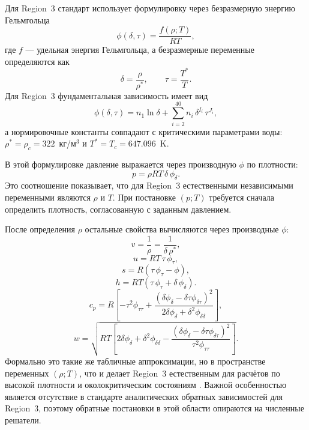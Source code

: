 Для Region~3 стандарт использует формулировку через безразмерную энергию Гельмгольца
\begin{equation}
\phi(\delta, \tau) = \frac{f(\rho; T)}{R T},
\end{equation}
где $f$ --- удельная энергия Гельмгольца,
а безразмерные переменные определяются как
\begin{equation}
\delta = \frac{\rho}{\rho^{*}}, \qquad \tau = \frac{T^{*}}{T}.
\end{equation}
Для Region~3 фундаментальная зависимость имеет вид
\begin{equation}
\phi(\delta,\tau) = n_{1}\ln\delta + \sum_{i=2}^{40} n_{i}\,\delta^{I_{i}}\,\tau^{J_{i}},
\end{equation}
а нормировочные константы совпадают
с критическими параметрами воды:
$\rho^{*}=\rho_{c}=322$~кг/м$^{3}$ и $T^{*}=T_{c}=647.096$~K.

В этой формулировке давление выражается через производную $\phi$ по плотности:
\begin{equation}
p = \rho R T\,\delta\,\phi_{\delta}.
\end{equation}
Это соотношение показывает,
что для Region~3 естественными независимыми переменными
являются $\rho$ и $T$.
При постановке $(p; T)$ требуется сначала определить плотность,
согласованную с заданным давлением.

После определения $\rho$
остальные свойства вычисляются через производные $\phi$:
\begin{equation}
v = \frac{1}{\rho} = \frac{1}{\delta\,\rho^{*}},
\end{equation}
\begin{equation}
u = R T\,\tau\,\phi_{\tau},
\end{equation}
\begin{equation}
s = R \left(\tau\,\phi_{\tau} - \phi\right),
\end{equation}
\begin{equation}
h = R T \left(\tau\,\phi_{\tau} + \delta\,\phi_{\delta}\right).
\end{equation}
\begin{equation}
c_{p} = R \left[
-\tau^{2}\phi_{\tau\tau}
+ \frac{\left(\delta\phi_{\delta} - \delta\tau\phi_{\delta\tau}\right)^{2}}
{2\delta\phi_{\delta} + \delta^{2}\phi_{\delta\delta}}
\right],
\end{equation}
\begin{equation}
w = \sqrt{R T \left[
2\delta\phi_{\delta} + \delta^{2}\phi_{\delta\delta}
- \frac{\left(\delta\phi_{\delta} - \delta\tau\phi_{\delta\tau}\right)^{2}}
{\tau^{2}\phi_{\tau\tau}}
\right]}.
\end{equation}
Формально это такие же табличные аппроксимации,
но в пространстве переменных $(\rho; T)$,
что и делает Region~3 естественным для расчётов
по высокой плотности и околокритическим состояниям \cite{iapws_if97_2012}.
Важной особенностью является отсутствие
в стандарте аналитических обратных зависимостей для Region~3,
поэтому обратные постановки в этой области
опираются на численные решатели.

